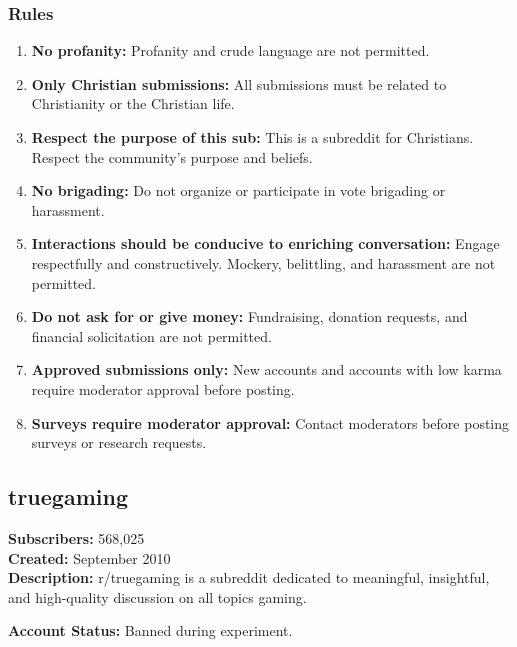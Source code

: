 \subsubsection{Rules}
\begin{enumerate}
    \item \textbf{No profanity:} Profanity and crude language are not permitted.
    
    \item \textbf{Only Christian submissions:} All submissions must be related to Christianity or the Christian life.
    
    \item \textbf{Respect the purpose of this sub:} This is a subreddit for Christians. Respect the community's purpose and beliefs.
    
    \item \textbf{No brigading:} Do not organize or participate in vote brigading or harassment.
    
    \item \textbf{Interactions should be conducive to enriching conversation:} Engage respectfully and constructively. Mockery, belittling, and harassment are not permitted.
    
    \item \textbf{Do not ask for or give money:} Fundraising, donation requests, and financial solicitation are not permitted.
    
    \item \textbf{Approved submissions only:} New accounts and accounts with low karma require moderator approval before posting.
    
    \item \textbf{Surveys require moderator approval:} Contact moderators before posting surveys or research requests.
\end{enumerate}

\subsection{truegaming}
\textbf{Subscribers:} 568,025 \\
\textbf{Created:} September 2010 \\
\textbf{Description:} r/truegaming is a subreddit dedicated to meaningful, insightful, and high-quality discussion on all topics gaming.

\textbf{Account Status:} Banned during experiment.

